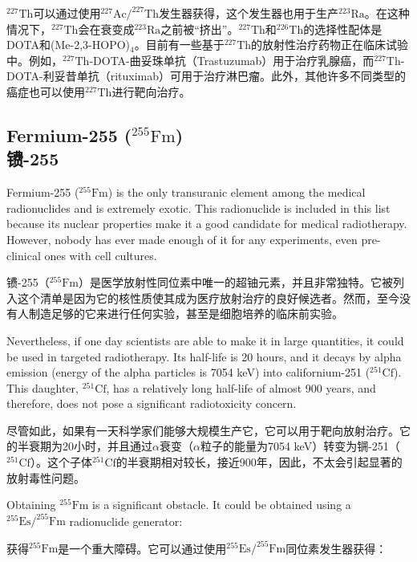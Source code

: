 \documentclass[dvipsnames, svgnames,a4paper,11pt]{article}
\begin{document}
\(\mathrm{^{227}Th}\)可以通过使用\(\mathrm{^{227}Ac/^{227}Th}\)发生器获得，这个发生器也用于生产\(\mathrm{^{223}Ra}\)。在这种情况下，\(\mathrm{^{227}Th}\)会在衰变成\(\mathrm{^{223}Ra}\)之前被“挤出”。\(\mathrm{^{227}Th}\)和\(\mathrm{^{226}Th}\)的选择性配体是DOTA和(Me-2,3-HOPO)\(_{4}\)。目前有一些基于\(\mathrm{^{227}Th}\)的放射性治疗药物正在临床试验中。例如，\(\mathrm{^{227}Th}\)-DOTA-曲妥珠单抗（Trastuzumab）用于治疗乳腺癌，而\(\mathrm{^{227}Th}\)-DOTA-利妥昔单抗（rituximab）可用于治疗淋巴瘤。此外，其他许多不同类型的癌症也可以使用\(\mathrm{^{227}Th}\)进行靶向治疗。

\subsection{Fermium-255 (\(\mathrm{^{255}Fm}\)) \\镄-255}  
Fermium-255 (\(\mathrm{^{255}Fm}\)) is the only transuranic element among the medical radionuclides and is extremely exotic. This radionuclide is included in this list because its nuclear properties make it a good candidate for medical radiotherapy. However, nobody has ever made enough of it for any experiments, even pre-clinical ones with cell cultures.  

镄-255（\(\mathrm{^{255}Fm}\)）是医学放射性同位素中唯一的超铀元素，并且非常独特。它被列入这个清单是因为它的核性质使其成为医疗放射治疗的良好候选者。然而，至今没有人制造足够的它来进行任何实验，甚至是细胞培养的临床前实验。  

Nevertheless, if one day scientists are able to make it in large quantities, it could be used in targeted radiotherapy. Its half-life is 20 hours, and it decays by alpha emission (energy of the alpha particles is 7054 keV) into californium-251 (\(\mathrm{^{251}Cf}\)). This daughter, \(\mathrm{^{251}Cf}\), has a relatively long half-life of almost 900 years, and therefore, does not pose a significant radiotoxicity concern.  

尽管如此，如果有一天科学家们能够大规模生产它，它可以用于靶向放射治疗。它的半衰期为20小时，并且通过$\alpha$衰变（$\alpha$粒子的能量为7054 keV）转变为锎-251（\(\mathrm{^{251}Cf}\)）。这个子体\(\mathrm{^{251}Cf}\)的半衰期相对较长，接近900年，因此，不太会引起显著的放射毒性问题。  

Obtaining \(\mathrm{^{255}Fm}\) is a significant obstacle. It could be obtained using a \(\mathrm{^{255}Es/^{255}Fm}\) radionuclide generator:  

获得\(\mathrm{^{255}Fm}\)是一个重大障碍。它可以通过使用\(\mathrm{^{255}Es/^{255}Fm}\)同位素发生器获得：  
\end{document}
